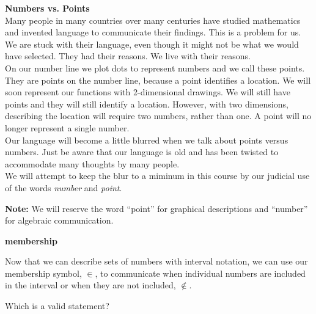 \documentclass{ximera}
\begin{document}
\begin{warning}  \textbf{\textcolor{red!80!black}{Numbers vs. Points}} \\

Many people in many countries over many centuries have studied mathematics and invented language to communicate their findings. This is a problem for us. We are stuck with their language, even though it might not be what we would have selected. They had their reasons.  We live with their reasons.\\

On our number line we plot dots to represent numbers and we call these points.  They are points on the number line, because a point identifies a location.  We will soon represent our functions with 2-dimensional drawings. We will still have points and they will still identify a location.  However, with two dimensions, describing the location will require two numbers, rather than one.  A point will no longer represent a single number.\\

Our language will become a little blurred when we talk about points versus numbers.  Just be aware that our language is old and has been twisted to accommodate many thoughts by many people.\\


We will attempt to keep the blur to a miminum in this course by our judicial use of the words \textit{number} and \textit{point}.

\textbf{Note:} We will reserve the word ``point'' for graphical descriptions and ``number'' for algebraic communication.
\end{warning}








\begin{notation}  \textbf{\textcolor{blue!55!black}{membership}} 

Now that we can describe sets of numbers with interval notation, we can use our membership symbol, $\in$, to communicate when individual numbers are included in the interval or when they are not included, $\notin$.

\end{notation}








\begin{question}
Which is a valid statement?
    \begin{multipleChoice}
    \choice {$ 2 \in [3, -2)$}
    \choice [correct]{$-2 \in [-2, 3)$}
    \end{multipleChoice}
\end{question}
\end{document}
